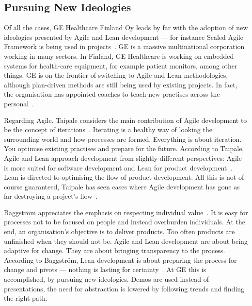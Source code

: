 \documentclass[english]{tktltiki2}
\begin{document}
\subsection{Pursuing New Ideologies}

Of all the cases, GE Healthcare Finland Oy leads by far with the adoption of new ideologies presented by Agile and Lean development — for instance Scaled Agile Framework is being used in projects~\cite{BT15}. GE is a massive multinational corporation working in many sectors. In Finland, GE Healthcare is working on embedded systems for health-care equipment, for example patient monitors, among other things. GE is on the frontier of switching to Agile and Lean methodologies, although plan-driven methods are still being used by existing projects. In fact, the organisation has appointed coaches to teach new practises across the personal~\cite{BT15}.

Regarding Agile, Taipale considers the main contribution of Agile development to be the concept of iterations~\cite{BT15}. Iterating is a healthy way of looking the surrounding world and how processes are formed. Everything is about iteration. You optimise existing practises and prepare for the future. According to Taipale, Agile and Lean approach development from slightly different perspectives: Agile is more suited for software development and Lean for product development~\cite{BT15}. Lean is directed to optimising the flow of product development. All this is not of course guaranteed, Taipale has seen cases where Agile development has gone as far destroying a project’s flow~\cite{BT15}.

Baggström appreciates the emphasis on respecting individual value~\cite{BT15}. It is easy for processes not to be focused on people and instead overburden individuals. At the end, an organisation’s objective is to deliver products. Too often products are unfinished when they should not be. Agile and Lean development are about being adaptive for change. They are about bringing transparency to the process. According to Baggström, Lean development is about preparing the process for change and pivots — nothing is lasting for certainty~\cite{BT15}. At GE this is accomplished, by pursuing new ideologies. Demos are used instead of presentations, the need for abstraction is lowered by following trends and finding the right path.
\end{document}
